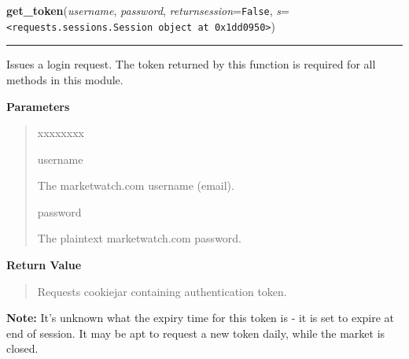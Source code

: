     \label{moira:get_token}

    \vspace{0.5ex}

\hspace{.8\funcindent}\begin{boxedminipage}{\funcwidth}

    \raggedright \textbf{get\_token}(\textit{username}, \textit{password}, \textit{returnsession}={\tt False}, \textit{s}={\tt {\textless}requests.sessions.Session object at 0x1dd0950{\textgreater}})

    \vspace{-1.5ex}

    \rule{\textwidth}{0.5\fboxrule}
\setlength{\parskip}{2ex}
    Issues a login request. The token returned by this function is required
    for all methods in this module.

\setlength{\parskip}{1ex}
      \textbf{Parameters}
      \vspace{-1ex}

      \begin{quote}
        \begin{Ventry}{xxxxxxxx}

          \item[username]

          The marketwatch.com username (email).

          \item[password]

          The plaintext marketwatch.com password.

        \end{Ventry}

      \end{quote}

      \textbf{Return Value}
    \vspace{-1ex}

      \begin{quote}
      Requests cookiejar containing authentication token.

      \end{quote}

\textbf{Note:} It's unknown what the expiry time for this token is - it is set to expire 
at end of session. It may be apt to request a new token daily, while the 
market is closed.



    \end{boxedminipage}

